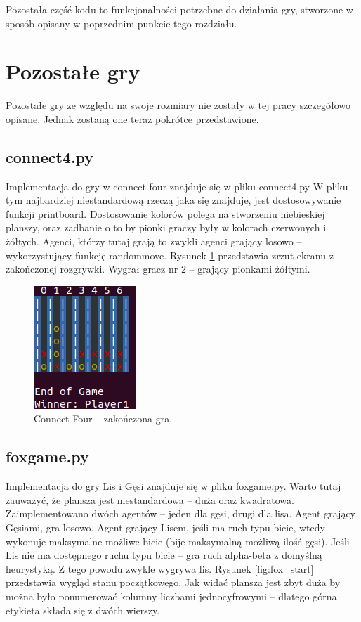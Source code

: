 \documentclass[polish,shortabstract,inz]{iithesis}
\begin{document}
Pozostała część kodu to funkcjonalności potrzebne do działania gry, stworzone w sposób opisany w poprzednim punkcie tego rozdziału.

\section{Pozostałe gry}
Pozostałe gry ze względu na swoje rozmiary nie zostały w tej pracy szczegółowo opisane.
Jednak zostaną one teraz pokrótce przedstawione.

\subsection{connect4.py}
Implementacja do gry w connect four znajduje się w pliku connect4.py
W pliku tym najbardziej niestandardową rzeczą jaka się znajduje, jest dostosowywanie funkcji print\textunderscore board.
Dostosowanie kolorów polega na stworzeniu niebieskiej planszy, oraz zadbanie o to by pionki graczy były w kolorach czerwonych i żółtych.
Agenci, którzy tutaj grają to zwykli agenci grający losowo -- wykorzystujący funkcję random\textunderscore move.
Rysunek \ref{fig:c4_game} przedstawia zrzut ekranu z zakończonej rozgrywki.
Wygrał gracz nr 2 -- grający pionkami żółtymi.

\begin{figure}[H]
  \includegraphics{./images/connect4game.png}
  \centering
  \caption{Connect Four -- zakończona gra.}
  \label{fig:c4_game}
\end{figure}


\subsection{fox\textunderscore game.py}
Implementacja do gry Lis i Gęsi znajduje się w pliku fox\textunderscore game.py.
Warto tutaj zauważyć, że plansza jest niestandardowa -- duża oraz kwadratowa.
Zaimplementowano dwóch agentów -- jeden dla gęsi, drugi dla lisa.
Agent grający Gęsiami, gra losowo.
Agent grający Lisem, jeśli ma ruch typu bicie, wtedy wykonuje maksymalne możliwe bicie (bije maksymalną możliwą ilość gęsi).
Jeśli Lis nie ma dostępnego ruchu typu bicie -- gra ruch alpha-beta z domyślną heurystyką.
Z tego powodu zwykle wygrywa lis.
Rysunek \ref{fig:fox_start} przedstawia wygląd stanu początkowego.
Jak widać plansza jest zbyt duża by można było ponumerować kolumny liczbami jednocyfrowymi -- dlatego górna etykieta składa się z dwóch wierszy.
\end{document}
